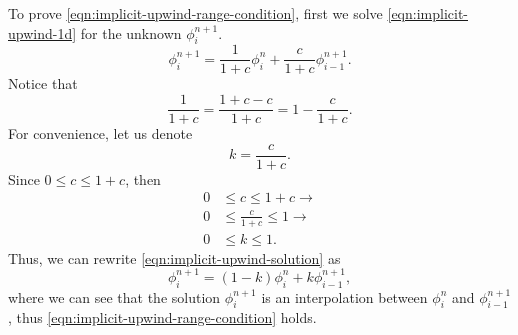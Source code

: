 \documentclass[../thesis.tex]{subfiles}
\begin{document}
To prove \eqref{eqn:implicit-upwind-range-condition}, first we solve \eqref{eqn:implicit-upwind-1d} for the unknown \(\phi_{i}^{n+1}\).
\begin{equation}\label{eqn:implicit-upwind-solution}
    \phi_{i}^{n+1} =
    \frac{1}{1+c}\phi_{i}^{n} + \frac{c}{1+c}\phi_{i-1}^{n+1}.
\end{equation}
Notice that
\[
    \frac{1}{1+c} = \frac{1+c-c}{1+c} = 1 - \frac{c}{1+c}.
\]
For convenience, let us denote
\begin{equation}\label{eqn:implicit-upwind-coefficient}
    k = \frac{c}{1+c}.
\end{equation}
Since \(0 \leq c \leq 1+c\), then
\begin{equation}
    \begin{split}
        0 &\leq c \leq 1+c \rightarrow\\
        0 &\leq \frac{c}{1+c} \leq 1 \rightarrow\\
        0 &\leq k \leq 1.
    \end{split}
\end{equation}
Thus, we can rewrite \eqref{eqn:implicit-upwind-solution} as
\begin{equation}\label{eqn:implicit-uwpind-linear-interpolation}
    \phi_{i}^{n+1} =
    (1-k)\phi_{i}^{n} + k\phi_{i-1}^{n+1},
\end{equation}
where we can see that the solution \(\phi_{i}^{n+1}\) is an interpolation
between \(\phi_{i}^{n}\) and \(\phi_{i-1}^{n+1}\), thus
\eqref{eqn:implicit-upwind-range-condition} holds.
\end{document}
